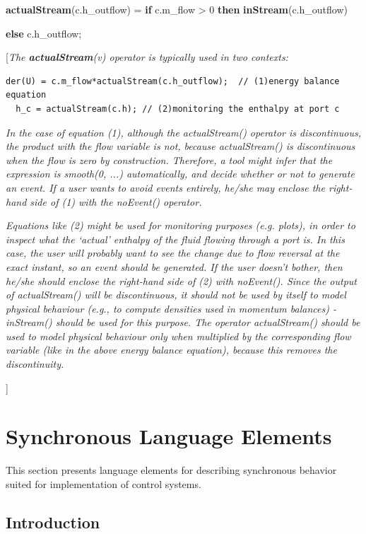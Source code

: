 \documentclass[10pt,a4paper]{report}
\def\doublelabel#1{\label{#1}\hypertarget{#1}{}}
\begin{document}
\textbf{actualStream}(c.h\_outflow) = \textbf{if} c.m\_flow
\textgreater{} 0 \textbf{then} \textbf{inStream}(c.h\_outflow)

\textbf{else} c.h\_outflow;

{[}\emph{The \textbf{actualStream}(v) operator is typically used in two
contexts:}
\begin{lstlisting}[language=modelica]
  der(U) = c.m_flow*actualStream(c.h_outflow);  // (1)energy balance equation
  h_c = actualStream(c.h); // (2)monitoring the enthalpy at port c
\end{lstlisting}
\emph{In the case of equation (1), although the actualStream() operator
is discontinuous, the product with the flow variable is not, because
actualStream() is discontinuous when the flow is zero by construction.
Therefore, a tool might infer that the expression is smooth(0, ...)
automatically, and decide whether or not to generate an event. If a user
wants to avoid events entirely, he/she may enclose the right-hand side
of (1) with the noEvent() operator. }

\emph{Equations like (2) might be used for monitoring purposes (e.g.
plots), in order to inspect what the `actual' enthalpy of the fluid
flowing through a port is. In this case, the user will probably want to
see the change due to flow reversal at the exact instant, so an event
should be generated. If the user doesn't bother, then he/she should
enclose the right-hand side of (2) with noEvent(). Since the output of
actualStream() will be discontinuous, it should not be used by itself to
model physical behaviour (e.g., to compute densities used in momentum
balances) - inStream() should be used for this purpose. The operator
actualStream() should be used to model physical behaviour only when
multiplied by the corresponding flow variable (like in the above energy
balance equation), because this removes the discontinuity.}

{]}

\chapter{Synchronous Language Elements}\doublelabel{synchronous-language-elements}

This section presents language elements for describing synchronous
behavior suited for implementation of control systems.

\section{Introduction}\doublelabel{introduction2}
\end{document}
